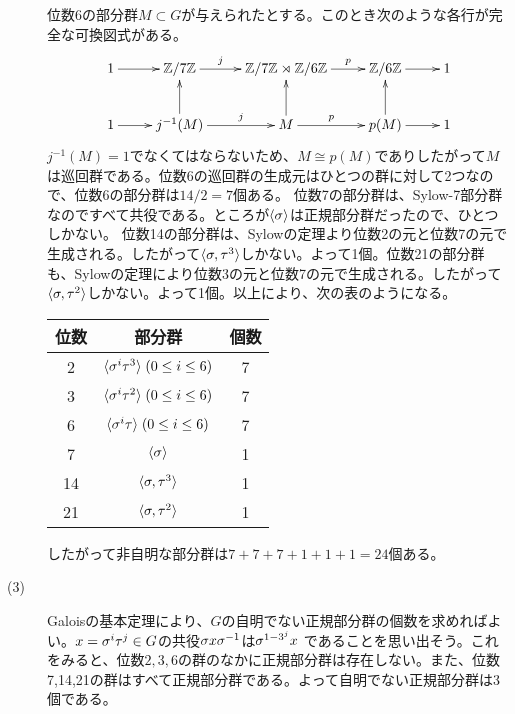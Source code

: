 \begin{sol}
\begin{description}
  位数6の部分群$M \subset G$が与えられたとする。このとき次のような各行が完全な可換図式がある。
\[
\xymatrix{
1 \ar[r] & \Z / 7 \Z \ar[r]^-j &  \Z / 7 \Z \rtimes \Z / 6 \Z \ar[r]^-p & \Z / 6 \Z \ar[r] & 1 \\
1 \ar[r] & j^{-1}(M) \ar[r]^-j  \ar[u] & M  \ar[u] \ar[r]^-p & p(M) \ar[r] \ar[u] & 1
}
\]
$j^{-1}(M) = 1$でなくてはならないため、$M \cong p(M)$でありしたがって$M$は巡回群である。位数6の巡回群の生成元はひとつの群に対して2つなので、位数6の部分群は$14/2 = 7$個ある。
  位数7の部分群は、Sylow-7部分群なのですべて共役である。ところが$\langle {\sigma} \rangle$は正規部分群だったので、ひとつしかない。
  位数14の部分群は、Sylowの定理より位数2の元と位数7の元で生成される。したがって$\langle {\sigma}, \tau^3 \rangle$しかない。よって1個。位数21の部分群も、Sylowの定理により位数3の元と位数7の元で生成される。したがって$\langle {\sigma}, \tau^2 \rangle$しかない。よって1個。以上により、次の表のようになる。
  \begin{center}
  \begin{tabular}{ccc}
   \hline
位数 & 部分群 & 個数 \\
   \hline \hline
   2 & $\langle {\sigma}^i \tau^3 \rangle  \; (0 \leq i \leq 6)$ &  7 \\
  3 & $\langle {\sigma}^i \tau^2 \rangle \; (0 \leq i \leq 6)$ &  7  \\
  6 & $\langle {\sigma}^i \tau \rangle \; (0 \leq i \leq 6)$ & 7 \\
  7 & $\langle {\sigma} \rangle$ & 1 \\
  14 & $\langle {\sigma}, \tau^3 \rangle$ & 1 \\
  21 & $\langle {\sigma}, \tau^2 \rangle$ & 1
   \end{tabular}
  \end{center}
  したがって非自明な部分群は$7 + 7 + 7 + 1 + 1 + 1 = 24$個ある。
  \item[(3)] Galoisの基本定理により、$G$の自明でない正規部分群の個数を求めればよい。$x = {\sigma}^i \tau^j \in G$の共役${\sigma} x {\sigma}^{-1}$は${\sigma}^{1 - 3^j} x$
    であることを思い出そう。これをみると、位数$2,3,6$の群のなかに正規部分群は存在しない。また、位数7,14,21の群はすべて正規部分群である。よって自明でない正規部分群は3個である。
\end{description}
\end{sol}
